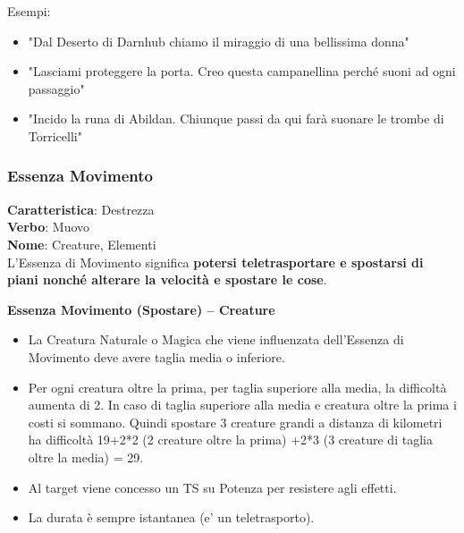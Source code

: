 \documentclass[a4paper,10 pt,twoside,openany]{book}
\begin{document}
\bigskip

Esempi:
\begin{itemize}
	\item
	"Dal Deserto di Darnhub chiamo il miraggio di una bellissima donna"
	\item
	"Lasciami proteggere la porta. Creo questa campanellina perché suoni ad ogni passaggio"
	\item
	"Incido la runa di Abildan. Chiunque passi da qui farà suonare le trombe di Torricelli"
\end{itemize}

\pagebreak

\subsubsection{Essenza Movimento}

\label{essenza-movimento---agilita}

\textbf{Caratteristica}: Destrezza\\
\textbf{Verbo}: Muovo\\
\textbf{Nome}: Creature, Elementi\\


L'Essenza di Movimento significa \textbf{potersi teletrasportare e spostarsi di piani nonché alterare la velocità e spostare le cose}.

\textbf{Essenza Movimento (Spostare) -- Creature}

\begin{itemize}
	\item
	La Creatura Naturale o Magica che viene influenzata dell'Essenza di Movimento deve avere taglia media o inferiore.
	\item
	Per ogni creatura oltre la prima, per taglia superiore alla media, la difficoltà aumenta di 2. In caso di taglia superiore alla media e creatura oltre la prima i costi si sommano. Quindi spostare 3 creature grandi a distanza di kilometri ha difficoltà 19+2*2 (2 creature oltre la prima) +2*3 (3 creature di taglia oltre la media) = 29.
	\item
	Al target viene concesso un TS su Potenza per resistere agli effetti.
	\item
	La durata è sempre istantanea (e' un teletrasporto).
\end{itemize}

\bigskip
\end{document}
